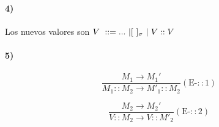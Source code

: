 \documentclass[10pt,a4paper, landscape]{article}
\begin{document}
\paragraph{4)} Los nuevos valores son $V~::= ...~| [~]_\sigma~|~V::V$

\paragraph{5)}
$$\frac{M_1\to M_1'}{M_1 :: M_2 \to M'_1::M_2}(\text{E-}::\text{1})$$

\vspace*{5mm}
$$\frac{M_2\to M_2'}{V :: M_2 \to V::M'_2}(\text{E-}::\text{2})$$
\end{document}
